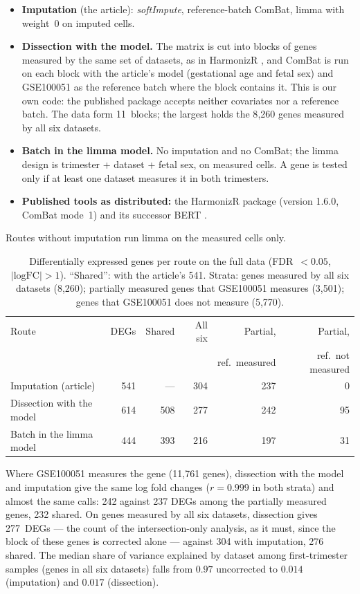 \documentclass[11pt,a4paper]{article}
\begin{document}
\begin{itemize}
\item \textbf{Imputation} (the article): \textit{softImpute},
  reference-batch ComBat, limma with weight~0 on imputed cells.
\item \textbf{Dissection with the model.} The matrix is cut into
  blocks of genes measured by the same set of datasets, as in
  HarmonizR \citep{Voss2022}, and ComBat is run on each block with
  the article's model (gestational age and fetal sex) and
  GSE100051 as the reference batch where the block contains it.
  This is our own code: the published package accepts neither
  covariates nor a reference batch. The data form 11~blocks; the
  largest holds the 8{,}260 genes measured by all six datasets.
\item \textbf{Batch in the limma model.} No imputation and no
  ComBat; the limma design is trimester + dataset + fetal sex, on
  measured cells. A gene is tested only if at least one dataset
  measures it in both trimesters.
\item \textbf{Published tools as distributed:} the HarmonizR
  package (version 1.6.0, ComBat mode~1) and its successor BERT
  \citep[Batch-Effect Reduction Trees, version 1.4.0;][]{Schumann2025}.
\end{itemize}

Routes without imputation run limma on the measured cells only.

\begin{table}[htbp]
\centering
\caption{Differentially expressed genes per route on the full data
  (FDR~$< 0.05$, $|\text{logFC}| > 1$). ``Shared'': with the
  article's 541. Strata: genes measured by all six datasets
  (8{,}260); partially measured genes that GSE100051 measures
  (3{,}501); genes that GSE100051 does not measure (5{,}770).}
\label{tab:supp-routes}
\begin{tabular}{lrrrrr}
\toprule
Route & DEGs & Shared & All six & Partial, & Partial, \\
 & & & & ref.\ measured & ref.\ not measured \\
\midrule
Imputation (article)      & 541 & --- & 304 & 237 & 0 \\
Dissection with the model & 614 & 508 & 277 & 242 & 95 \\
Batch in the limma model  & 444 & 393 & 216 & 197 & 31 \\
\bottomrule
\end{tabular}
\end{table}

Where GSE100051 measures the gene (11{,}761 genes), dissection with
the model and imputation give the same log fold changes
($r = 0.999$ in both strata) and almost the same calls: 242
against 237 DEGs among the partially measured genes, 232 shared.
On genes measured by all six datasets, dissection gives 277~DEGs
--- the count of the intersection-only analysis, as it must,
since the block of these genes is corrected alone --- against 304
with imputation, 276 shared. The median share of variance
explained by dataset among first-trimester samples (genes in all
six datasets) falls from $0.97$ uncorrected to $0.014$
(imputation) and $0.017$ (dissection).
\end{document}

